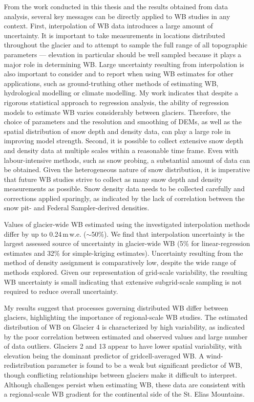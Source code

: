 \documentclass{sfuthesis}
\begin{document}
From the work conducted in this thesis and the results obtained from data analysis, several key messages can be directly applied to WB studies in any context. First, interpolation of WB data introduces a large amount of uncertainty. It is important to take measurements in locations distributed throughout the glacier and to attempt to sample the full range of all topographic parameters --- elevation in particular should be well sampled because it plays a major role in determining WB. Large uncertainty resulting from interpolation is also important to consider and to report when using WB estimates for other applications, such as ground-truthing other methods of estimating WB, hydrological modelling or climate modelling. My work indicates that despite a rigorous statistical approach to regression analysis, the ability of regression models to estimate WB varies considerably between glaciers. Therefore, the choice of parameters and the resolution and smoothing of DEMs, as well as the spatial distribution of snow depth and density data, can play a large role in improving model strength. Second, it is possible to collect extensive snow depth and density data at multiple scales within a reasonable time frame. Even with labour-intensive methods, such as snow probing, a substantial amount of data can be obtained. Given the heterogeneous nature of snow distribution, it is imperative that future WB studies strive to collect as many snow depth and density measurements as possible. Snow density data needs to be collected carefully and corrections applied sparingly, as indicated by the lack of correlation between the snow pit- and Federal Sampler-derived densities. 

Values of glacier-wide WB estimated using the investigated interpolation methods differ by up to 0.24\,m\,w.e. ($\sim$50\%). We find that interpolation uncertainty is the largest assessed source of uncertainty in glacier-wide WB (5\% for linear-regression estimates and 32\% for simple-kriging estimates). Uncertainty resulting from the method of density assignment is comparatively low, despite the wide range of methods explored. Given our representation of grid-scale variability, the resulting WB uncertainty is small indicating that extensive subgrid-scale sampling is not required to reduce overall uncertainty. 

My results suggest that processes governing distributed WB differ between glaciers, highlighting the importance of regional-scale WB studies. The estimated distribution of WB on Glacier 4 is characterized by high variability, as indicated by the poor correlation between estimated and observed values and large number of data outliers. Glaciers 2 and 13 appear to have lower spatial variability, with elevation being the dominant predictor of gridcell-averaged WB. A wind-redistribution parameter is found to be a weak but significant predictor of WB, though conflicting relationships between glaciers make it difficult to interpret. Although challenges persist when estimating WB, these data are consistent with a regional-scale WB gradient for the continental side of the St. Elias Mountains.
\end{document}
